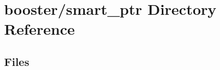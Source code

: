 \section{booster/smart\+\_\+ptr Directory Reference}
\label{dir_f1a171b40d31e7485c894ccadfa8f6f3}
\subsection*{Files}
\begin{DoxyCompactItemize}
\end{DoxyCompactItemize}
